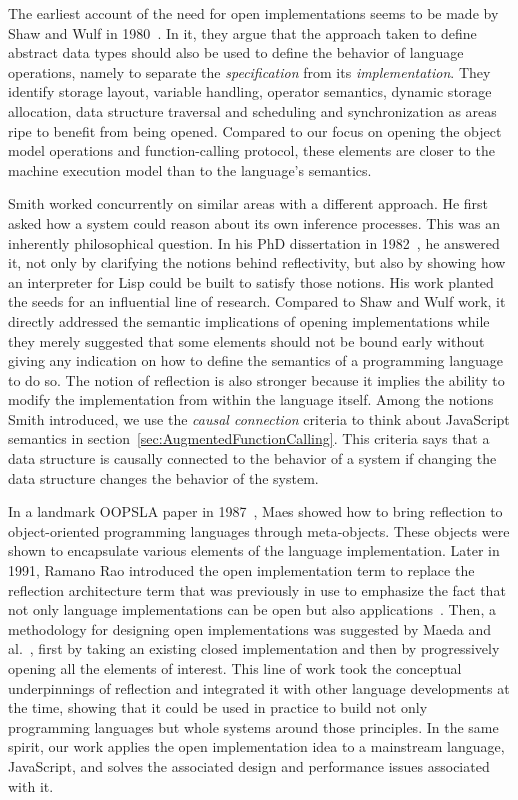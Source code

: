 The earliest account of the need for open implementations seems to be made by
Shaw and Wulf in 1980~\cite{Shaw:1980}. In it, they argue that the approach
taken to define abstract data types should also be used to define the behavior
of language operations, namely to separate the \textit{specification} from its
\textit{implementation}. They identify storage layout, variable handling,
operator semantics, dynamic storage allocation, data structure traversal and
scheduling and synchronization as areas ripe to benefit from being opened.
Compared to our focus on opening the object model operations and
function-calling protocol, these elements are closer to the machine execution
model than to the language's semantics. 

Smith worked concurrently on similar areas with a different approach. He first
asked how a system could reason about its own inference processes. This was an
inherently philosophical question. In his PhD dissertation in
1982~\cite{Smith:1982}, he answered it, not only by clarifying the notions
behind reflectivity, but also by showing how an interpreter for Lisp could be
built to satisfy those notions. His work planted the seeds for an influential
line of research. Compared to Shaw and Wulf work, it directly addressed the
semantic implications of opening implementations while they merely suggested
that some elements should not be bound early without giving any indication on
how to define the semantics of a programming language to do so.  The notion of
reflection is also stronger because it implies the ability to modify the
implementation from within the language itself. Among the notions Smith
introduced, we use the \textit{causal connection} criteria to think about
JavaScript semantics in section~\ref{sec:AugmentedFunctionCalling}. This
criteria says that a data structure is causally connected to the behavior of a
system if changing the data structure changes the behavior of the system.

In a landmark OOPSLA paper in 1987~\cite{Maes:1987}, Maes showed how to
bring reflection to object-oriented programming languages through meta-objects.
These objects were shown to encapsulate various elements of the language
implementation. Later in 1991, Ramano Rao introduced the open implementation
term to replace the reflection architecture term that was previously in use to
emphasize the fact that not only language implementations can be open but also
applications~\cite{Rao:1991}. Then, a methodology for designing open
implementations was suggested by Maeda and al.~\cite{Maeda:1997}, first by
taking an existing closed implementation and then by progressively opening all
the elements of interest. This line of work took the conceptual underpinnings
of reflection and integrated it with other language developments at the time,
showing that it could be used in practice to build not only programming
languages but whole systems around those principles. In the same spirit, our
work applies the open implementation idea to a mainstream language, JavaScript,
and solves the associated design and performance issues associated with it.

